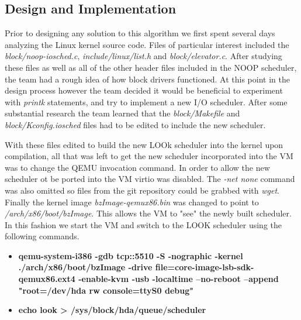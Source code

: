 \documentclass[10pt,onecolumn,draftclsnofoot]{IEEEtran} %
\begin{document}
\newpage
\begin{singlespace}
\section{\bf  Design and Implementation}

  \normalfont \indent Prior to designing any solution to this algorithm we first spent several days analyzing the Linux kernel source code. Files of particular interest included the \textit{block/noop-iosched.c}, \textit{include/linux/list.h} and \textit{block/elevator.c}. After studying these files as well as all of the other header files included in the NOOP scheduler, the team had a rough idea of how block drivers functioned. At this point in the design process however the team decided it would be beneficial to experiment with \textit{printk} statements, and try to implement a new I/O scheduler. After some substantial research the team learned that the \textit{block/Makefile} and \textit{block/Kconfig.iosched} files had to be edited to include the new scheduler.

  \normalfont \indent With these files edited to build the new LOOk scheduler into the kernel upon compilation, all that was left to get the new scheduler incorporated into the VM was to change the QEMU invocation command. In order to allow the new scheduler ot be ported into the VM virtio was disabled. The \textit{-net none} command was also omitted so files from the git repository could be grabbed with \textit{wget}. Finally the kernel image \textit{bzImage-qemux86.bin} was changed to point to \textit{/arch/x86/boot/bzImage}. This allows the VM to "see" the newly built scheduler. In this fashion we start the VM and switch to the LOOK scheduler using the following commands.

  \begin{itemize}
        \item \textbf{qemu-system-i386 -gdb tcp::5510 -S -nographic -kernel ./arch/x86/boot/bzImage -drive file=core-image-lsb-sdk-qemux86.ext4 -enable-kvm -usb -localtime --no-reboot --append "root=/dev/hda rw console=ttyS0 debug"}
        \item \textbf{echo look > /sys/block/hda/queue/scheduler}
  \end{itemize}


\end{singlespace}
\end{document}
